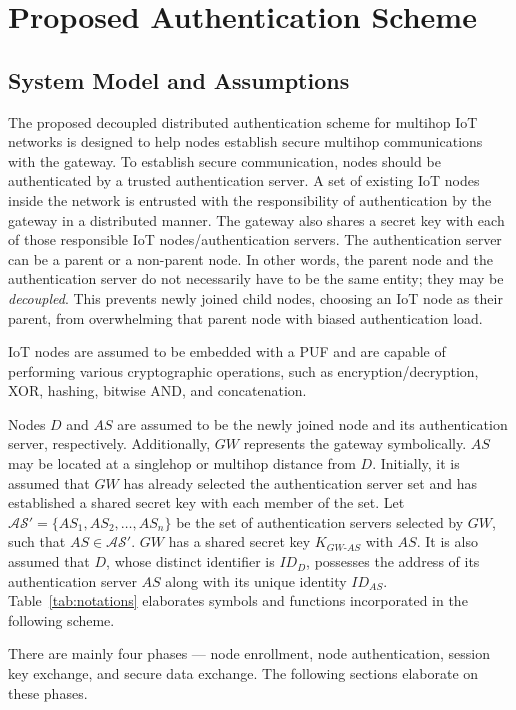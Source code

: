 \documentclass[conference]{IEEEtran}
\begin{document}
\section{Proposed Authentication Scheme}

\subsection{System Model and Assumptions}

The proposed decoupled distributed authentication scheme for multihop IoT
networks is designed to help nodes establish secure multihop communications
with the gateway.  To establish secure communication, nodes should be
authenticated by a trusted authentication server.  A set of existing IoT
nodes inside the network is entrusted with the responsibility of
authentication by the gateway in a distributed manner.  The gateway also
shares a secret key with each of those responsible IoT
nodes/authentication servers.  The authentication server can be a parent or
a non-parent node.  In other words, the parent node and the authentication
server do not necessarily have to be the same entity; they may be
\emph{decoupled}.  This prevents newly joined child nodes, choosing an IoT
node as their parent, from overwhelming that parent node with biased
authentication load.

IoT nodes are assumed to be embedded with a PUF and are capable of
performing various cryptographic operations, such as
encryption/decryption, XOR, hashing, bitwise AND, and concatenation.

Nodes $D$ and $AS$ are assumed to be the newly joined node and its
authentication server, respectively.  Additionally, $GW$ represents the
gateway symbolically.  $AS$ may be located at a singlehop or multihop
distance from $D$.  Initially, it is assumed that $GW$ has already selected
the authentication server set and has established a shared secret key with
each member of the set.  Let $\mathcal{AS}' = \{AS_1, AS_2, \ldots, AS_n\}$
be the set of authentication servers selected by $GW$, such that
$AS \in \mathcal{AS}'$.  $GW$ has a shared secret key $K_{GW\text{-}AS}$
with $AS$.  It is also assumed that $D$, whose distinct identifier is
$ID_D$, possesses the address of its authentication server $AS$ along with
its unique identity $ID_{AS}$.  Table~\ref{tab:notations} elaborates
symbols and functions incorporated in the following scheme.

There are mainly four phases — node enrollment, node authentication, session
key exchange, and secure data exchange.  The following sections elaborate on
these phases.
\end{document}
